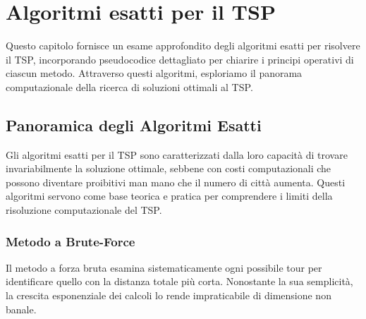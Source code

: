 
%

\makeatletter
\newcommand{\ntifpkgloaded}{%
	\@ifpackageloaded%
}
\makeatother

\chapter{Algoritmi esatti per il \gls{TSP}} \label{chapt:3}

Questo capitolo fornisce un esame approfondito degli algoritmi esatti per risolvere il \gls{TSP}, incorporando pseudocodice dettagliato per chiarire i principi operativi di ciascun metodo. Attraverso questi algoritmi, esploriamo il panorama computazionale della ricerca di soluzioni ottimali al \gls{TSP}.

\section{Panoramica degli Algoritmi Esatti}

Gli algoritmi esatti per il \gls{TSP} sono caratterizzati dalla loro capacità di trovare invariabilmente la soluzione ottimale, sebbene con costi computazionali che possono diventare proibitivi man mano che il numero di città aumenta. Questi algoritmi servono come base teorica e pratica per comprendere i limiti della risoluzione computazionale del \gls{TSP}.

\subsection{Metodo a Brute-Force}

Il metodo a forza bruta esamina sistematicamente ogni possibile tour per identificare quello con la distanza totale più corta. Nonostante la sua semplicità, la crescita esponenziale dei calcoli lo rende impraticabile di dimensione non banale.

